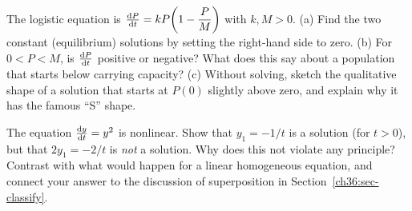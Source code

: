 \begin{exercise}
\label{ch36:ex-logistic1}
The logistic equation is $\frac{\mathrm{d} P}{\mathrm{d} t} = kP\!\left(1 - \dfrac{P}{M}\right)$ with $k, M > 0$.
(a) Find the two constant (equilibrium) solutions by setting the right-hand side to zero.
(b) For $0 < P < M$, is $\frac{\mathrm{d} P}{\mathrm{d} t}$ positive or negative? What does this say about a population that starts below carrying capacity?
(c) Without solving, sketch the qualitative shape of a solution that starts at $P(0)$ slightly above zero, and explain why it has the famous ``S'' shape.
\end{exercise}

\begin{exercise}
\label{ch36:ex-superposition1}
The equation $\frac{\mathrm{d} y}{\mathrm{d} t} = y^2$ is nonlinear. Show that $y_1 = -1/t$ is a solution (for $t>0$), but that $2y_1 = -2/t$ is \emph{not} a solution. Why does this not violate any principle? Contrast with what would happen for a linear homogeneous equation, and connect your answer to the discussion of superposition in Section~\ref{ch36:sec-classify}.
\end{exercise}
